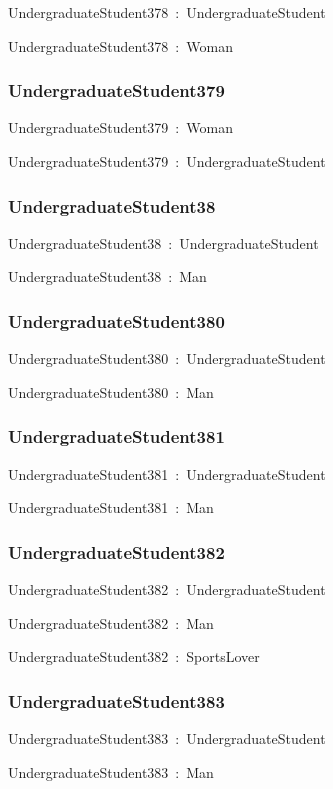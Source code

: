 \documentclass{article}
\begin{document}
UndergraduateStudent378~:~UndergraduateStudent

UndergraduateStudent378~:~Woman

\subsubsection*{UndergraduateStudent379}

UndergraduateStudent379~:~Woman

UndergraduateStudent379~:~UndergraduateStudent

\subsubsection*{UndergraduateStudent38}

UndergraduateStudent38~:~UndergraduateStudent

UndergraduateStudent38~:~Man

\subsubsection*{UndergraduateStudent380}

UndergraduateStudent380~:~UndergraduateStudent

UndergraduateStudent380~:~Man

\subsubsection*{UndergraduateStudent381}

UndergraduateStudent381~:~UndergraduateStudent

UndergraduateStudent381~:~Man

\subsubsection*{UndergraduateStudent382}

UndergraduateStudent382~:~UndergraduateStudent

UndergraduateStudent382~:~Man

UndergraduateStudent382~:~SportsLover

\subsubsection*{UndergraduateStudent383}

UndergraduateStudent383~:~UndergraduateStudent

UndergraduateStudent383~:~Man
\end{document}
